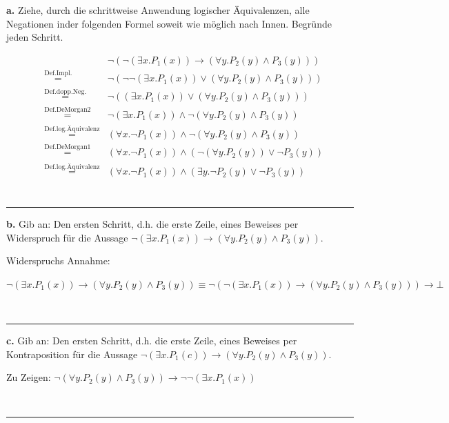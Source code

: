 \documentclass[10pt,leqno ]{article}
\newcommand\customeq[1]{\overset{\mathrm{#1}}{=}}
\theoremstyle{definition}
\newenvironment{solution}[1][L]{\begin{doublespace}\textbf{#1.}\quad }{\ \rule{0.5em}{0.5em}\end{doublespace}}
\begin{document}
\begin{solution}[a]
    Ziehe, durch die schrittweise Anwendung logischer Äquivalenzen, alle Negationen inder folgenden Formel soweit wie möglich nach Innen. Begründe jeden Schritt.

    \begin{equation*}
        \begin{aligned}
        && \lnot(\lnot(\exists x . P_1(x)) \rightarrow (\forall y . P_2(y) \land P_3(y))) \\
        & \customeq{Def. Impl.} & \lnot(\lnot \lnot(\exists x . P_1(x)) \lor (\forall y . P_2(y) \land P_3(y))) \\
        & \customeq{Def. dopp. Neg.} & \lnot((\exists x . P_1(x)) \lor (\forall y . P_2(y) \land P_3(y))) \\
        & \customeq{Def.DeMorgan2} & \lnot(\exists x . P_1(x)) \land \lnot (\forall y . P_2(y) \land P_3(y)) \\
        & \customeq{Def. log.\textrm{Äquivalenz}} & (\forall x . \lnot P_1(x)) \land \lnot (\forall y . P_2(y) \land P_3(y)) \\
        & \customeq{Def. DeMorgan1} & (\forall x . \lnot P_1(x)) \land (\lnot(\forall y . P_2(y)) \lor \lnot P_3(y)) \\
        & \customeq{Def. log.\textrm{Äquivalenz}} & (\forall x . \lnot P_1(x)) \land (\exists y . \lnot P_2(y) \lor \lnot P_3(y)) \\
        \end{aligned}
    \end{equation*}
\end{solution}

\begin{solution}[b]
    Gib an: Den ersten Schritt, d.h. die erste Zeile, eines Beweises per Widerspruch für die
    Aussage \( \lnot(\exists x . P_1(x)) \rightarrow (\forall y . P_2(y) \land P_3(y)) \).

    Widerspruchs Annahme: 
    
    \( \lnot(\exists x . P_1(x)) \rightarrow (\forall y . P_2(y) \land P_3(y)) \equiv \lnot(\lnot(\exists x . P_1(x)) \rightarrow (\forall y . P_2(y) \land P_3(y))) \rightarrow \bot \)

\end{solution}

\begin{solution}[c]
    Gib an: Den ersten Schritt, d.h. die erste Zeile, eines Beweises per Kontraposition für die
    Aussage \( \lnot(\exists x . P_1(c)) \rightarrow (\forall y . P_2(y) \land P_3(y)) \).

    Zu Zeigen: \( \lnot(\forall y . P_2(y) \land P_3(y)) \rightarrow \lnot \lnot(\exists x . P_1(x))\)

\end{solution}
\end{document}
